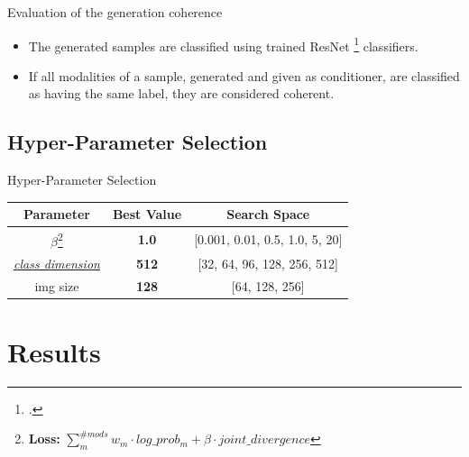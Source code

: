     \begin{frame}{Evaluation of the generation coherence}
    \begin{itemize}
        \item The generated samples are classified using trained ResNet \footcite{he2016deep} classifiers.
        \pause
        \item If all modalities of a sample, generated and given as conditioner, are classified as having the same label, they are considered coherent.
    \end{itemize}
    \end{frame}

    \subsection{Hyper-Parameter Selection}
    \begin{frame}{Hyper-Parameter Selection}
        \begin{center}
        \begin{table}[]

        \begin{tabular}{ c c c }
         Parameter & Best Value & Search Space \\
         \midrule
         $\beta$\footnote{\textbf{Loss:} $\sum_m^{\#mods} w_m \cdot log\_prob_m + \beta \cdot joint\_divergence $} & \textbf{1.0} & [0.001, 0.01, 0.5, 1.0, 5, 20] \\
         \hyperlink{mopoe_graph}{\textit{class dimension}} & \textbf{512} & [32, 64, 96, 128, 256, 512]\\
         img size & \textbf{128} & [64, 128, 256]
        \end{tabular}
        \end{table}
        \end{center}

    \end{frame}


    \section{Results}

